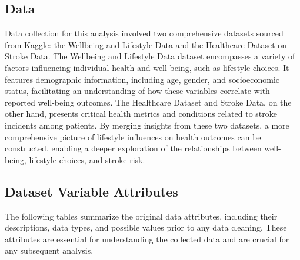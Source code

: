 \documentclass[runningheads]{llncs}
\begin{document}
\begin{enumerate}
\section{Data}
Data collection for this analysis involved two comprehensive datasets sourced from Kaggle: the Wellbeing and Lifestyle Data and the Healthcare Dataset on Stroke Data. The Wellbeing and Lifestyle Data dataset encompasses a variety of factors influencing individual health and well-being, such as lifestyle choices. It features demographic information, including age, gender, and socioeconomic status, facilitating an understanding of how these variables correlate with reported well-being outcomes. The Healthcare Dataset and Stroke Data, on the other hand, presents critical health metrics and conditions related to stroke incidents among patients. By merging insights from these two datasets, a more comprehensive picture of lifestyle influences on health outcomes can be constructed, enabling a deeper exploration of the relationships between well-being, lifestyle choices, and stroke risk.


\subsection{Dataset Variable Attributes}

The following tables summarize the original data attributes, including their descriptions, data types, and possible values prior to any data cleaning. These attributes are essential for understanding the collected data and are crucial for any subsequent analysis.


\end{enumerate}
\end{document}
